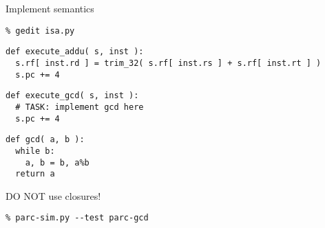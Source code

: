 \begin{task}
\begin{frame}[fragile]{Implement semantics}

\vspace{-15pt}

\begin{Verbatim}[commandchars=\\\{\}]
% cd \midtilde/pydgin-tut/parc
% gedit isa.py
\end{Verbatim}
\vspace{-20pt}
\begin{lstlisting}[firstnumber=342]
def execute_addu( s, inst ):
  s.rf[ inst.rd ] = trim_32( s.rf[ inst.rs ] + s.rf[ inst.rt ] )
  s.pc += 4
\end{lstlisting}
\vspace{-30pt}
\begin{lstlisting}[firstnumber=329]
def execute_gcd( s, inst ):
  # TASK: implement gcd here
  s.pc += 4
\end{lstlisting}
\vspace{-30pt}
\begin{lstlisting}[numbers=none]
def gcd( a, b ):
  while b:
    a, b = b, a%b
  return a
\end{lstlisting}
\vspace{-10pt}
 DO NOT use closures!
\begin{Verbatim}[commandchars=\\\{\}]
% cd \midtilde/pydgin-tut/parc/asm_tests/build
% parc-sim.py --test parc-gcd
\end{Verbatim}

\end{frame}
\end{task}


